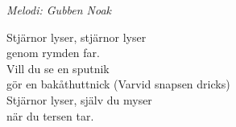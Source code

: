 {\footnotesize\textit{Melodi: Gubben Noak}}\par
\vspace{10pt}
Stjärnor lyser, stjärnor lyser\\
genom rymden far.\\
Vill du se en sputnik\\
gör en bakåthuttnick (Varvid snapsen dricks)\\
Stjärnor lyser, själv du myser\\
när du tersen tar.
